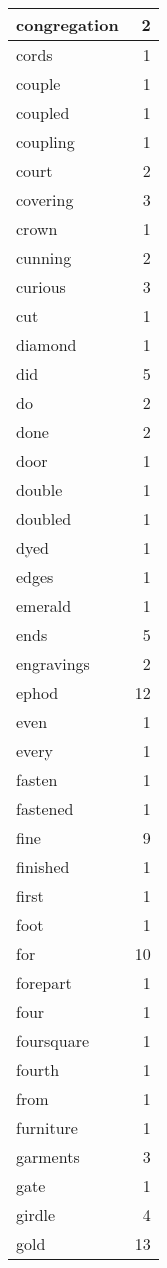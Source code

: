 \begin{center}
\begin{longtable}{l|r}
congregation & 2 \\ \hline
cords & 1 \\ \hline
couple & 1 \\ \hline
coupled & 1 \\ \hline
coupling & 1 \\ \hline
court & 2 \\ \hline
covering & 3 \\ \hline
crown & 1 \\ \hline
cunning & 2 \\ \hline
curious & 3 \\ \hline
cut & 1 \\ \hline
diamond & 1 \\ \hline
did & 5 \\ \hline
do & 2 \\ \hline
done & 2 \\ \hline
door & 1 \\ \hline
double & 1 \\ \hline
doubled & 1 \\ \hline
dyed & 1 \\ \hline
edges & 1 \\ \hline
emerald & 1 \\ \hline
ends & 5 \\ \hline
engravings & 2 \\ \hline
ephod & 12 \\ \hline
even & 1 \\ \hline
every & 1 \\ \hline
fasten & 1 \\ \hline
fastened & 1 \\ \hline
fine & 9 \\ \hline
finished & 1 \\ \hline
first & 1 \\ \hline
foot & 1 \\ \hline
for & 10 \\ \hline
forepart & 1 \\ \hline
four & 1 \\ \hline
foursquare & 1 \\ \hline
fourth & 1 \\ \hline
from & 1 \\ \hline
furniture & 1 \\ \hline
garments & 3 \\ \hline
gate & 1 \\ \hline
girdle & 4 \\ \hline
gold & 13 \\ \hline

\end{longtable}
\end{center}
